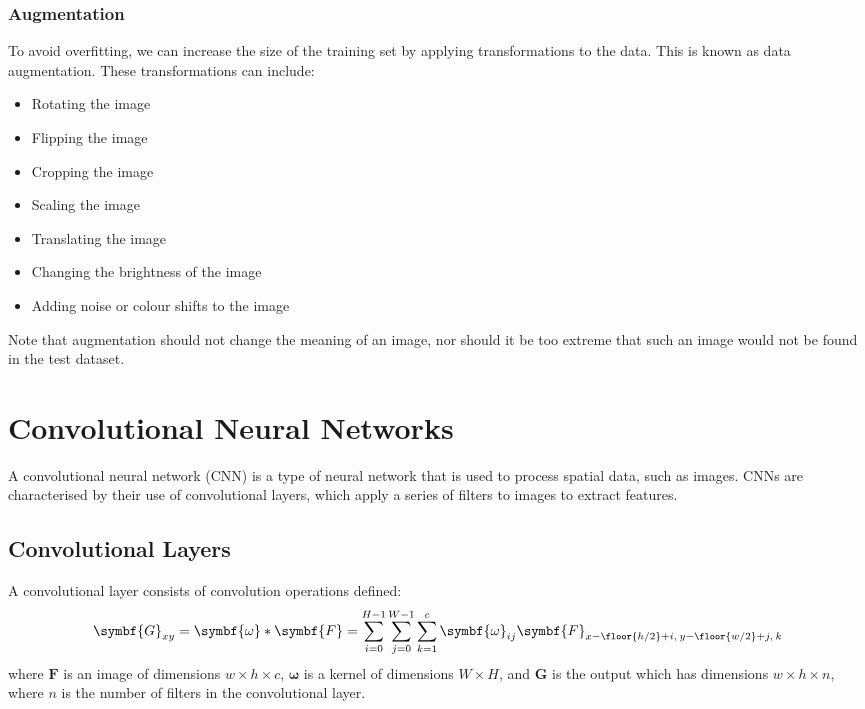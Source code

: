\documentclass{article}
\begin{document}
\subsubsection{Augmentation}
To avoid overfitting, we can increase the size of the training set by
applying transformations to the data. This is known as data
augmentation. These transformations can include:
\begin{itemize}
    \item Rotating the image
    \item Flipping the image
    \item Cropping the image
    \item Scaling the image
    \item Translating the image
    \item Changing the brightness of the image
    \item Adding noise or colour shifts to the image
\end{itemize}
Note that augmentation should not change the meaning of an image, nor
should it be too extreme that such an image would not be found in the
test dataset.
\section{Convolutional Neural Networks}
A convolutional neural network (CNN) is a type of neural network that
is used to process spatial data, such as images. CNNs are characterised
by their use of convolutional layers, which apply a series of filters
to images to extract features.
\subsection{Convolutional Layers}
A convolutional layer consists of convolution operations defined:
\begin{equation*}
    \symbf{G}_{xy} = \symbf{\omega} \ast \symbf{F} = \sum_{i = 0}^{H-1} \sum_{j = 0}^{W-1} \sum_{k = 1}^c \symbf{\omega}_{ij} \symbf{F}_{x - \floor{h/2} + i,\: y - \floor{w/2} + j, \: k}
\end{equation*}
where \(\symbf{F}\) is an image of dimensions \(w \times h \times c\),
\(\symbf{\omega}\) is a kernel of dimensions \(W \times H\), and
\(\symbf{G}\) is the output which has dimensions \(w \times h \times n\),
where \(n\) is the number of filters in the convolutional layer.
\end{document}
